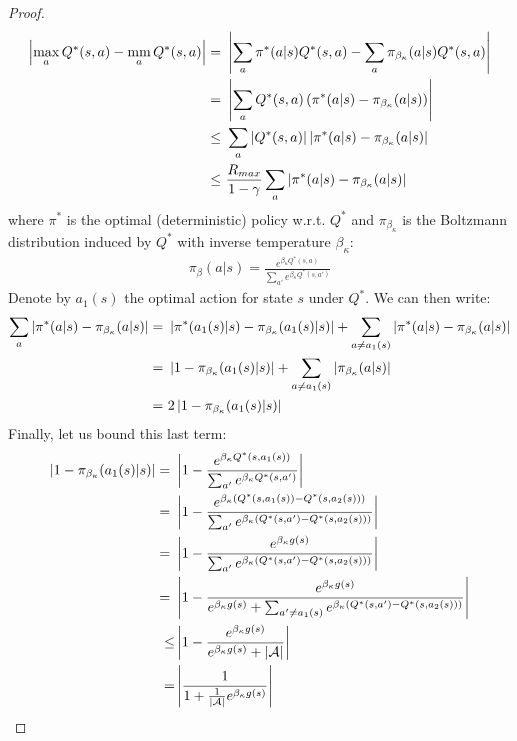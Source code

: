 \documentclass{article}
\newcommand{\mm}{\operatornamewithlimits{mm}}
\newcommand{\abs}[1]{\left\lvert #1 \right\rvert}
\begin{document}
\begin{proof}
\begin{align} \label{eq:mm2}
\abs{\max_a Q^*(s,a) - \mm_a Q^*(s,a)} =\ & \abs{\sum_a \pi^*(a|s)Q^*(s,a) - \sum_a \pi_{\beta_{\kappa}}(a|s)Q^*(s,a)}\notag\\ =\ & \abs{\sum_a Q^*(s,a) \left( \pi^*(a|s) - \pi_{\beta_{\kappa}}(a|s)  \right)}\notag\\ \leq\ & \sum_a \abs{Q^*(s,a)} \abs{\pi^*(a|s) - \pi_{\beta_{\kappa}}(a|s)}\notag\\ \leq\ & \frac{R_{max}}{1-\gamma}\sum_a\abs{\pi^*(a|s) - \pi_{\beta_{\kappa}}(a|s)}
\end{align}
where $\pi^*$ is the optimal (deterministic) policy w.r.t. $Q^*$ and $\pi_{\beta_{\kappa}}$ is the Boltzmann distribution induced by $Q^*$ with inverse temperature $\beta_{\kappa}$:
\begin{align*}
\pi_{\beta}(a|s) = \frac{e^{\beta_{\kappa} Q^*(s,a)}}{\sum_{a'}e^{\beta_{\kappa} Q^*(s,a')}}
\end{align*}
Denote by $a_1(s)$ the optimal action for state $s$ under $Q^*$. We can then write:
\begin{align} \label{eq:mm3}
\sum_a\abs{\pi^*(a|s) - \pi_{\beta_{\kappa}}(a|s)} =\ & \abs{\pi^*(a_1(s)|s) - \pi_{\beta_{\kappa}}(a_1(s)|s)} + \sum_{a \neq a_1(s)}\abs{\pi^*(a|s) - \pi_{\beta_{\kappa}}(a|s)}\notag\\ =\ & \abs{1 - \pi_{\beta_{\kappa}}(a_1(s)|s)} + \sum_{a \neq a_1(s)}\abs{\pi_{\beta_{\kappa}}(a|s)}\notag\\ =\ & 2\abs{1 - \pi_{\beta_{\kappa}}(a_1(s)|s)}
\end{align}
Finally, let us bound this last term:
\begin{align} \label{eq:mm4}
\abs{1 - \pi_{\beta_{\kappa}}(a_1(s)|s)} =\ & \abs{1 - \frac{e^{\beta_{\kappa} Q^*(s,a_1(s))}}{\sum_{a'}e^{\beta_{\kappa} Q^*(s,a')}}}\notag\\ =\ & \abs{1 - \frac{e^{\beta_{\kappa} \left( Q^*(s,a_1(s)) - Q^*(s,a_2(s)) \right)}}{\sum_{a'}e^{\beta_{\kappa} \left( Q^*(s,a') - Q^*(s,a_2(s))\right)}}}\notag\\ =\ & \abs{1 - \frac{e^{\beta_{\kappa} g(s)}}{\sum_{a'}e^{\beta_{\kappa} \left( Q^*(s,a') - Q^*(s,a_2(s))\right)}}}\notag\\ =\ & \abs{1 - \frac{e^{\beta_{\kappa} g(s)}}{e^{\beta_{\kappa} g(s)} + \sum_{a' \neq a_1(s)}e^{\beta_{\kappa} \left( Q^*(s,a') - Q^*(s,a_2(s))\right)}}}\notag\\ \leq & \abs{1 - \frac{e^{\beta_{\kappa} g(s)}}{e^{\beta_{\kappa} g(s)} + \abs{\mathcal{A}}}}\notag\\ = & \abs{\frac{1}{1 + \frac{1}{\abs{\mathcal{A}}}e^{\beta_{\kappa} g(s)}}}

\end{align}
\end{proof}
\end{document}
